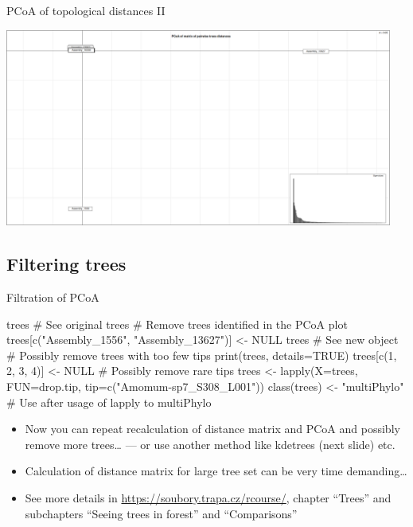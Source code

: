 \documentclass[compress, ucs, xelatex, 11pt, xcolor=x11names, aspectratio=169,
	hyperref={
		bookmarks=true,
		unicode=true,
		colorlinks=true,
		pdftitle={HybSeq course},
		plainpages=false,
		pdfauthor={Vojtech Zeisek},
		pdfsubject={Practical processing of HybSeq target enrichment sequencing data on computing grids like MetaCentrum},
		pdfcreator={XeLaTeX},
		pdfkeywords={BASH, command line, GNU, HybSeq, Linux, MetaCentrum, sequencing shell, target enrichment},
		linkcolor=Turquoise4, %
		anchorcolor=DodgerBlue4, %
		citecolor=DodgerBlue4, %
		filecolor=DodgerBlue4, %
		menucolor=Tan4, %
		urlcolor=DarkOliveGreen4, %
		pdftex},
	url={hyphens, lowtilde} %
	]{beamer}
\begin{document}
\begin{frame}{PCoA of topological distances II}
	\begin{center}
		\includegraphics[height=6.5cm]{pcoa.png}
	\end{center}
\end{frame}

\subsection{Filtering trees}

\begin{frame}[fragile]{Filtration of PCoA}
	\begin{spluscode}
    trees # See original trees
    # Remove trees identified in the PCoA plot
    trees[c("Assembly_1556", "Assembly_13627")] <- NULL
    trees # See new object
    # Possibly remove trees with too few tips
    print(trees, details=TRUE)
    trees[c(1, 2, 3, 4)] <- NULL
    # Possibly remove rare tips
    trees <- lapply(X=trees, FUN=drop.tip, tip=c("Amomum-sp7_S308_L001"))
    class(trees) <- "multiPhylo" # Use after usage of lapply to multiPhylo
	\end{spluscode}
	\begin{itemize}
		\item Now you can repeat recalculation of distance matrix and PCoA and possibly remove more trees\ldots{ }--- or use another method like kdetrees (next slide) etc.
		\item Calculation of distance matrix for large tree set can be very time demanding\ldots
		\item See more details in \url{https://soubory.trapa.cz/rcourse/}, chapter \enquote{Trees} and subchapters \enquote{Seeing trees in forest} and \enquote{Comparisons}
	\end{itemize}
\end{frame}
\end{document}
